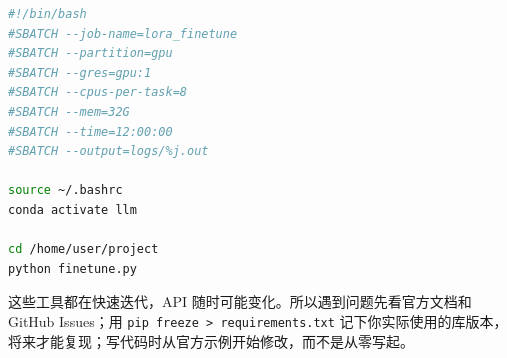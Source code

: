 \begin{lstlisting}[language=bash, caption=对应的SLURM脚本]
#!/bin/bash
#SBATCH --job-name=lora_finetune
#SBATCH --partition=gpu
#SBATCH --gres=gpu:1
#SBATCH --cpus-per-task=8
#SBATCH --mem=32G
#SBATCH --time=12:00:00
#SBATCH --output=logs/%j.out

source ~/.bashrc
conda activate llm

cd /home/user/project
python finetune.py
\end{lstlisting}

\begin{remark}
这些工具都在快速迭代，API 随时可能变化。所以遇到问题先看官方文档和 GitHub Issues；用 \texttt{pip freeze > requirements.txt} 记下你实际使用的库版本，将来才能复现；写代码时从官方示例开始修改，而不是从零写起。
\end{remark}